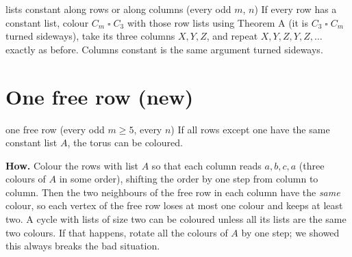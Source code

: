\documentclass[11pt,oneside,openany]{book}
\newcommand{\T}{\mathbin{\square}}
\begin{document}
\begin{proved}{lists constant along rows or along columns (every odd $m$, $n$)}
If every row has a constant list, colour $C_m \T C_3$ with those row lists using Theorem A (it is
$C_3 \T C_m$ turned sideways), take its three columns $X, Y, Z$, and repeat
$X, Y, Z, Y, Z, \dots$ exactly as before. Columns constant is the same argument turned sideways.
\end{proved}

\section{One free row (new)}

\begin{proved}{one free row (every odd $m \ge 5$, every $n$)}
If all rows except one have the same constant list $A$, the torus can be coloured.
\end{proved}

\begin{center}
\end{center}

\textbf{How.} Colour the rows with list $A$ so that each column reads $a, b, c, a$ (three colours
of $A$ in some order), shifting the order by one step from column to column. Then the two
neighbours of the free row in each column have the \emph{same} colour, so each vertex of the free
row loses at most one colour and keeps at least two. A cycle with lists of size two can be
coloured unless all its lists are the same two colours. If that happens, rotate all the colours
of $A$ by one step; we showed this always breaks the bad situation.
\end{document}
